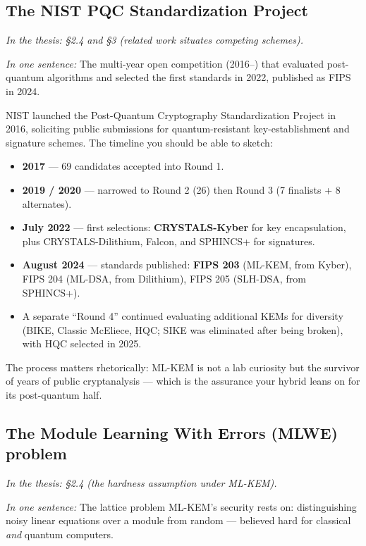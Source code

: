 \documentclass[11pt]{article}
\newcommand{\seethesis}[1]{%
  {\small\color{softgray}\textit{In the thesis: #1}}\par\vspace{3pt}}
\newcommand{\nutshell}[1]{\noindent\textit{In one sentence:} #1\par\vspace{4pt}}
\begin{document}
\subsection{The NIST PQC Standardization Project}
\seethesis{\S2.4 and \S3 (related work situates competing schemes).}
\nutshell{The multi-year open competition (2016--) that evaluated post-quantum
algorithms and selected the first standards in 2022, published as FIPS in 2024.}

NIST launched the Post-Quantum Cryptography Standardization Project in 2016,
soliciting public submissions for quantum-resistant key-establishment and
signature schemes. The timeline you should be able to sketch:
\begin{itemize}
  \item \textbf{2017} --- 69 candidates accepted into Round 1.
  \item \textbf{2019 / 2020} --- narrowed to Round 2 (26) then Round 3 (7
  finalists + 8 alternates).
  \item \textbf{July 2022} --- first selections: \textbf{CRYSTALS-Kyber} for
  key encapsulation, plus CRYSTALS-Dilithium, Falcon, and SPHINCS+ for
  signatures.
  \item \textbf{August 2024} --- standards published: \textbf{FIPS 203}
  (ML-KEM, from Kyber), FIPS 204 (ML-DSA, from Dilithium), FIPS 205 (SLH-DSA,
  from SPHINCS+).
  \item A separate ``Round 4'' continued evaluating additional KEMs for
  diversity (BIKE, Classic McEliece, HQC; SIKE was eliminated after being
  broken), with HQC selected in 2025.
\end{itemize}
The process matters rhetorically: ML-KEM is not a lab curiosity but the survivor
of years of public cryptanalysis --- which is the assurance your hybrid leans on
for its post-quantum half.

\subsection{The Module Learning With Errors (MLWE) problem}
\seethesis{\S2.4 (the hardness assumption under ML-KEM).}
\nutshell{The lattice problem ML-KEM's security rests on: distinguishing
noisy linear equations over a module from random --- believed hard for classical
\emph{and} quantum computers.}
\end{document}
